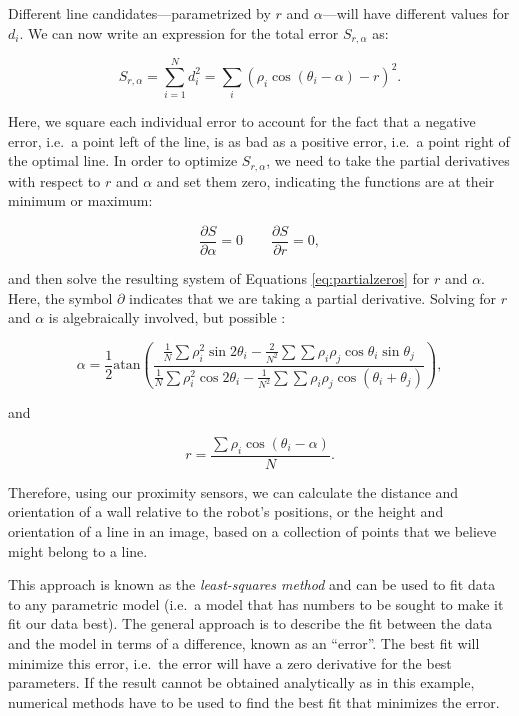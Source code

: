 Different line candidates---parametrized by $ r$ and $ \alpha$---will have different values for $ d_i$. We can now write an expression for the total error $ S_{r,\alpha}$ as:

\begin{equation}
S_{r,\alpha}=\sum_{i=1}^{N}{d_i^2}=\sum_i(\rho_i \cos(\theta_i-\alpha)-r)^2.
\end{equation}

Here, we square each individual error to account for the fact that a negative error, i.e.\ a point left of the line, is as bad as a positive error, i.e.\ a point right of the optimal line. In order to optimize $ S_{r,\alpha}$, we need to take the partial derivatives with respect to $ r$ and $ \alpha$ and set them zero, indicating the functions are at their minimum or maximum:

\begin{equation}
\frac{\partial{S}}{\partial{\alpha}}=0 \qquad \frac{\partial{S}}{\partial{r}}=0,
\label{eq:partialzeros}
\end{equation}

\noindent and then solve the resulting system of Equations \eqref{eq:partialzeros} for $ r$ and $ \alpha$. Here, the symbol $ \partial$ indicates that we are taking a partial derivative. Solving for $r$ and $\alpha$ is algebraically involved, but possible \cite{siegwart2011introduction}:

\begin{equation}\label{eq:linealpha}
\alpha=\frac{1}{2}\text{atan}\left(\frac{\frac{1}{N}\sum{\rho_i^2 \sin 2\theta_i}-\frac{2}{N^2}\sum{\sum{\rho_i\rho_j \cos \theta_i \sin \theta_j}}}{\frac{1}{N}\sum{\rho_i^2 \cos 2 \theta_i - \frac{1}{N^2}\sum{\sum{\rho_i \rho_j \cos(\theta_i+\theta_j)}}}}\right),
\end{equation}

\noindent and

\begin{equation}\label{eq:liner}
r=\frac{{\sum \rho_i \cos (\theta_i-\alpha)}}{N}.
\end{equation}

Therefore, using our proximity sensors, we can calculate the distance and orientation of a wall relative to the robot's positions, or the height and orientation of a line in an image, based on a collection of points that we believe might belong to a line.

This approach is known as the \textsl{least-squares method} and can be used to fit data to any parametric model (i.e.\ a model that has numbers to be sought to make it fit our data best). The general approach is to describe the fit between the data and the model in terms of a difference, known as an ``error''. The best fit will minimize this error, i.e.\ the error will have a zero derivative for the best parameters. If the result cannot be obtained analytically as in this example, numerical methods have to be used to find the best fit that minimizes the error.

